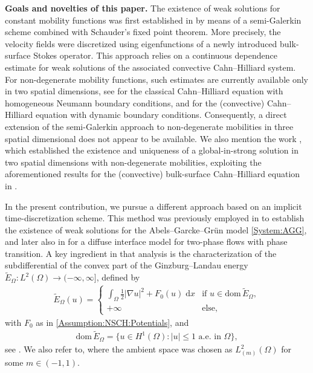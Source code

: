\documentclass[11pt,reqno]{amsart}
\theoremstyle{remark}
\numberwithin{equation}{section}
\newcommand{\abs}[1]{|#1|}
\newcommand{\intO}{\int_\Omega}
\newcommand{\dx}{\;\mathrm{d}x}
\newcommand{\Grad}{\nabla}
\newcommand{\Om}{\Omega}
\begin{document}
\medskip
\noindent
\textbf{Goals and novelties of this paper.} The existence of weak solutions for constant mobility functions was first established in \cite{Knopf2025a} by means of a semi-Galerkin scheme combined with Schauder's fixed point theorem. More precisely, the velocity fields were discretized using eigenfunctions of a newly introduced bulk-surface Stokes operator. This approach relies on a continuous dependence estimate for weak solutions of the associated convective Cahn--Hilliard system. For non-degenerate mobility functions, such estimates are currently available only in two spatial dimensions, see \cite{Conti2025} for the classical Cahn--Hilliard equation with homogeneous Neumann boundary conditions, and \cite{Stange2025,Stange2026} for the (convective) Cahn--Hilliard equation with dynamic boundary conditions. Consequently, a direct extension of the semi-Galerkin approach to non-degenerate mobilities in three spatial dimensional does not appear to be available. 
We also mention the work \cite{Stange2025}, which established the existence and uniqueness of a global-in-strong solution in two spatial dimensions with non-degenerate mobilities, exploiting the aforementioned results for the (convective) bulk-surface Cahn--Hilliard equation in \cite{Stange2025,Stange2026}.

In the present contribution, we pursue a different approach based on an implicit time-discretization scheme. This method was previously employed in \cite{Abels2013} to establish the existence of weak solutions for the Abels--Garcke--Grün model \eqref{System:AGG}, and later also in \cite{Abels2026} for a diffuse interface model for two-phase flows with phase transition. A key ingredient in that analysis is the characterization of the subdifferential of the convex part of the Ginzburg--Landau energy  $\widetilde E_\Om: L^2(\Om)\rightarrow(-\infty,\infty]$, defined by
\begin{align*}
	\widetilde E_\Om(u) = \begin{cases} 
	\intO \frac12\abs{\Grad u}^2 + F_0(u)\dx &\text{if~} u\in\mathrm{dom}\,\widetilde E_\Om, \\
	+\infty &\text{else},
	\end{cases}
\end{align*}
with $F_0$ as in \ref{Assumption:NSCH:Potentials}, and
\begin{align*}
	\mathrm{dom}\,\widetilde E_\Om = \{u\in H^1(\Om): \abs{u}\leq 1 \text{~a.e.~in~}\Om\},
\end{align*}
see \cite{Abels2007a}. We also refer to\cite{Abels2007}, where the ambient space was chosen as $L^2_{(m)}(\Om)$ for some $m\in(-1,1)$.
\end{document}
